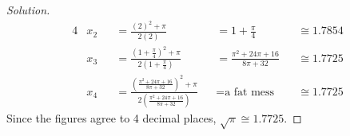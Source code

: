 \documentclass{agony}
\begin{document}
\begin{enumerate}[(a)]
\begin{enumerate}[(i)]
\begin{proof}[Solution]
\begin{alignat*}{4}
                     & x_2                              &  & = \frac{(2)^2+\pi}{2(2)}                                                           &
                     & = 1+\frac\pi4                    &  & \cong 1.7854                                                                         \\
                     & x_3                              &  & = \frac{(1+\frac\pi4)^2+\pi}{2(1+\frac\pi4)}                                       &
                     & = \frac{\pi^2+24\pi+16}{8\pi+32} &  & \cong 1.7725                                                                         \\
                     & x_4                              &  & = \frac{(\frac{\pi^2+24\pi+16}{8\pi+32})^2+\pi}{2(\frac{\pi^2+24\pi+16}{8\pi+32})} &
                     & = \textrm{a fat mess}            &  & \cong 1.7725
                  \end{alignat*}
                  Since the figures agree to 4 decimal places, $\sqrt{\pi} \cong 1.7725$.
                \end{proof}
        \end{enumerate}
\end{enumerate}
\end{document}
